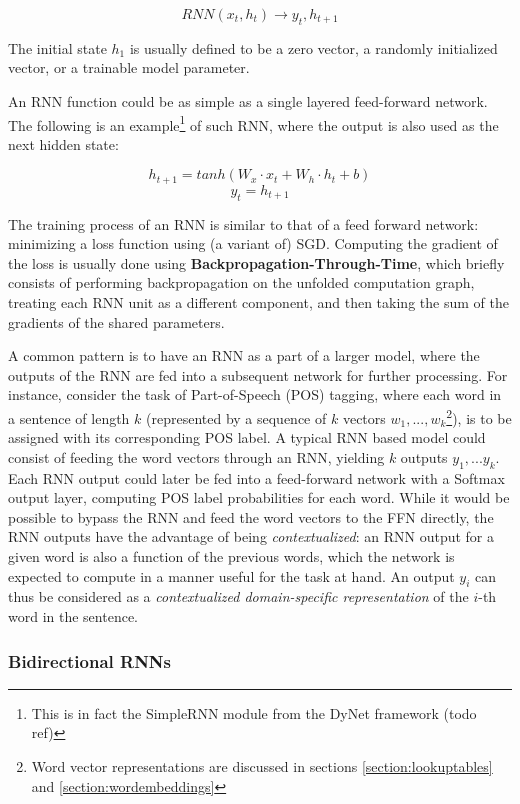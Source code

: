 $$ RNN(x_t, h_t) \rightarrow y_t, h_{t+1} $$

The initial state $h_1$ is usually defined to be a zero vector, a randomly initialized vector, or a trainable model parameter. 

An RNN function could be as simple as a single layered feed-forward network. The following is an example\footnote{This is in fact the SimpleRNN module from the DyNet framework (todo ref)} of such RNN, where the output is also used as the next hidden state:

$$h_{t+1} = tanh(W_x \cdot x_t + W_h \cdot h_t + b)$$
$$y_t = h_{t+1}$$

The training process of an RNN is similar to that of a feed forward network: minimizing a loss function using (a variant of) SGD. Computing the gradient of the loss is usually done using \textbf{Backpropagation-Through-Time}, which briefly consists of performing backpropagation on the unfolded computation graph, treating each RNN unit as a different component, and then taking the sum of the gradients of the shared parameters. 

A common pattern is to have an RNN as a part of a larger model, where the outputs of the RNN are fed into a subsequent network for further processing. For instance, consider the task of Part-of-Speech (POS) tagging, where each word in a sentence of length $k$ (represented by a sequence of $k$ vectors $w_1,...,w_k$\footnote{Word vector representations are discussed in sections \ref{section:lookuptables} and \ref{section:wordembeddings}}), is to be assigned with its corresponding POS label. A typical RNN based model could consist of feeding the word vectors through an RNN, yielding $k$ outputs $y_1,...y_k$. Each RNN output could later be fed into a feed-forward network with a Softmax output layer, computing POS label probabilities for each word. While it would be possible to bypass the RNN and feed the word vectors to the FFN directly, the RNN outputs have the advantage of being \emph{contextualized}: an RNN output for a given word is also a function of the previous words, which the network is expected to compute in a manner useful for the task at hand. An output $y_i$ can thus be considered as a \emph{contextualized domain-specific representation} of the $i$-th word in the sentence.

\subsubsection{Bidirectional RNNs}

